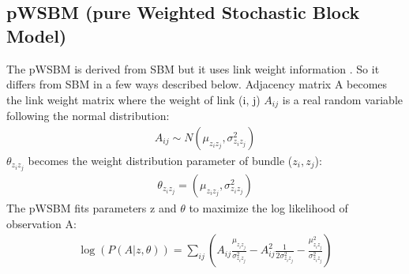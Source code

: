 \documentclass{article} %
\begin{document}
\subsection{pWSBM (pure Weighted Stochastic Block Model)}
The pWSBM is derived from SBM but it uses link weight information \citep{aicher2014learning}.
So it differs from SBM in a few ways described below.
Adjacency matrix A becomes the link weight matrix where the weight of link (i, j)  $ A_{ij} $ is a real random variable following the normal distribution:
\begin{align*}
A_{ij} \sim N(\mu_{z_i z_j}, \sigma_{z_i z_j}^2)
\end{align*}
$ \theta_{z_i z_j} $ becomes the weight distribution parameter of bundle ($z_i, z_j$):
\begin{align*}
\theta_{z_i z_j} = (\mu_{z_i z_j}, \sigma_{z_i z_j}^2)
\end{align*}
The pWSBM fits parameters z and $ \theta $
to maximize the log likelihood of observation A:
\begin{align*}
\log(P(A|z, \theta))
= \sum_{ij} (
A_{ij} \frac{\mu_{z_i z_j}}{\sigma_{z_i z_j}^2}
- A_{ij}^2 \frac{1}{2\sigma_{z_i z_j}^2}
- \frac{\mu_{z_i z_j}^2}{\sigma_{z_i z_j}^2}
)
\end{align*}
\end{document}
